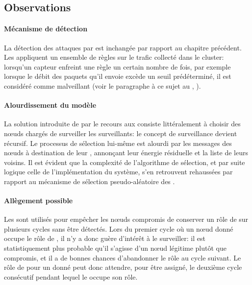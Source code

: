     \subsection{Observations}

\paragraph{Mécanisme de détection}
La détection des attaques par \dds est inchangée par rapport au chapitre précédent.
Les \cns appliquent un ensemble de règles sur le trafic collecté dans le cluster: lorsqu'un capteur enfreint une règle un certain nombre de fois, par exemple lorsque le débit des paquets qu'il envoie excède un seuil prédéterminé, il est considéré comme malveillant (voir le paragraphe à ce sujet au , ).

\paragraph{Alourdissement du modèle}
La solution introduite de par le recours aux \vns consiste littéralement à choisir des nœuds chargés de surveiller les surveillants: le concept de surveillance devient récursif.
Le processus de sélection lui-même est alourdi par les messages des nœuds à destination de leur \ch, annonçant leur énergie résiduelle et la liste de leurs voisins.
Il est évident que la complexité de l'algorithme de sélection, et par suite logique celle de l'implémentation du système, s'en retrouvent rehaussées par rapport au mécanisme de sélection pseudo-aléatoire des \cns.

\paragraph{Allègement possible}
Les \vns sont utilisés pour empêcher les nœuds compromis de conserver un rôle de \cn sur plusieurs cycles sans être détectés.
Lors du premier cycle où un nœud donné occupe le rôle de \cn, il n'y a donc guère d'intérêt à le surveiller: il est statistiquement plus probable qu'il s'agisse d'un nœud légitime plutôt que compromis, et il a de bonnes chances d'abandonner le rôle au cycle suivant.
Le rôle de \vn pour un \cn donné peut donc attendre, pour être assigné, le deuxième cycle consécutif pendant lequel le \cn occupe son rôle.

